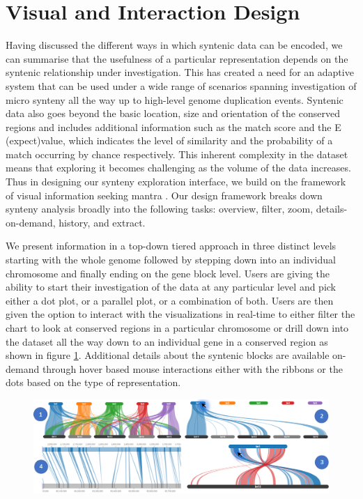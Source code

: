 \section{Visual and Interaction Design}

Having discussed the different ways in which syntenic data can be encoded, we can summarise that the usefulness of a particular representation depends on the syntenic relationship under investigation. This has created a need for an adaptive system that can be used under a wide range of scenarios spanning investigation of micro synteny all the way up to high-level genome duplication events. Syntenic data also goes beyond the basic location, size and orientation of the conserved regions and includes additional information such as the match score and the E (expect)value, which indicates the level of similarity and the probability of a match occurring by chance respectively. This inherent complexity in the dataset means that exploring it becomes challenging as the volume of the data increases. Thus in designing our synteny exploration interface, we build on the framework of visual information seeking mantra \cite{Shneiderman96theeyes}. Our design framework breaks down synteny analysis broadly into the following tasks: overview, filter, zoom, details-on-demand, history, and extract.

We present information in a top-down tiered approach in three distinct levels starting with the whole genome followed by stepping down into an individual chromosome and finally ending on the gene block level. Users are giving the ability to start their investigation of the data at any particular level and pick either a dot plot, or a parallel plot, or a combination of both. Users are then given the option to interact with the visualizations in real-time to either filter the chart to look at conserved regions in a particular chromosome or drill down into the dataset all the way down to an individual gene in a conserved region as shown in figure \ref{fig:ch_4_exploration_through_interaction}. Additional details about the syntenic blocks are available on-demand through hover based mouse interactions either with the ribbons or the dots based on the type of representation.

\begin{figure}[h]
  \centering
  \includegraphics[width=1\linewidth]{images/ch_4_exploration_through_interaction.PNG}
  \label{fig:ch_4_exploration_through_interaction}
\end{figure}


